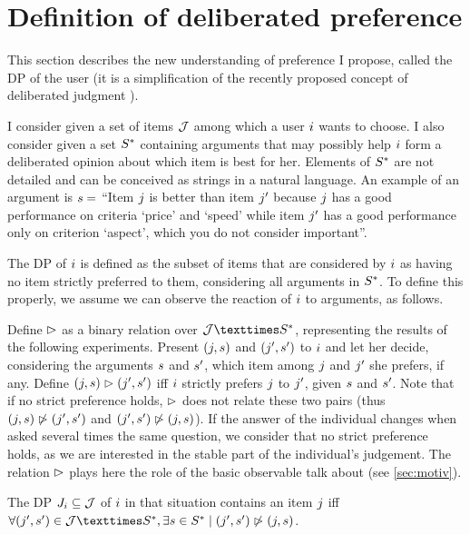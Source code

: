 \documentclass[version=3.21, pagesize, twoside=off, bibliography=totoc, DIV=calc, fontsize=12pt, a4paper, french, english]{scrartcl}
\begin{document}
\section{Definition of deliberated preference}
\label{sec:def}
This section describes the new understanding of preference I  propose, called the \ac{DP} of the user (it is a simplification of the recently proposed concept of deliberated judgment \citep{cailloux_formal_2018}).

I consider given a set of items $\mathcal{J}$ among which a user $i$ wants to choose. I also consider given a set $S^*$ containing arguments that may possibly help $i$ form a deliberated opinion about which item is best for her. Elements of $S^*$ are not detailed and can be conceived as strings in a natural language. An example of an argument is $s = $ “Item $j$ is better than item $j'$ because $j$ has a good performance on criteria ‘price’ and ‘speed’ while item $j'$ has a good performance only on criterion ‘aspect’, which you do not consider important”.

The \ac{DP} of $i$ is defined as the subset of items that are considered by $i$ as having no item strictly preferred to them, considering all arguments in $S^*$. To define this properly, we assume we can observe the reaction of $i$ to arguments, as follows. 

Define $\vartriangleright$ as a binary relation over $\allitems × \allargs$, representing the results of the following experiments. Present $(j, s)$ and $(j', s')$ to $i$ and let her decide, considering the arguments $s$ and $s'$, which item among $j$ and $j'$ she prefers, if any. 
Define $(j, s) \vartriangleright (j', s')$ iff $i$ strictly prefers $j$ to $j'$, given $s$ and $s'$. Note that if no strict preference holds, $\vartriangleright$ does not relate these two pairs (thus $(j, s) \not\vartriangleright (j', s')$ and $(j', s') \not\vartriangleright (j, s)$). If the answer of the individual changes when asked several times the same question, we consider that no strict preference holds, as we are interested in the stable part of the individual’s judgement. 
The relation $\vartriangleright$ plays here the role of the basic observable  \citeauthor{von_neumann_theory_1944} talk about (see \cref{sec:motiv}).

The \ac{DP} $J_i \subseteq \mathcal{J}$ of $i$ in that situation contains an item $j$ iff $\forall (\itm', \ar') \in \allitems × \allargs, \exists \ar \in \allargs \suchthat (\itm', \ar') \nibeats (\itm, \ar)$.
\end{document}
